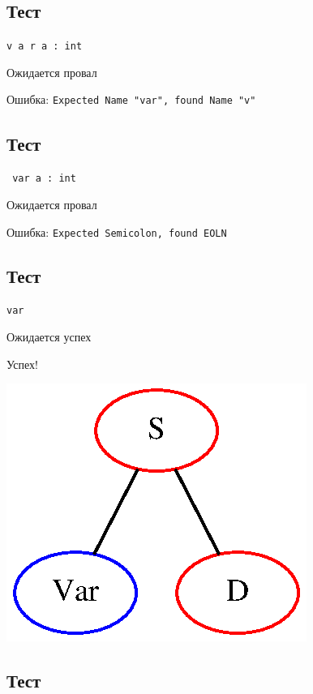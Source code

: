\subsection{Тест }

\texttt{v a r a : int}

Ожидается провал

Ошибка: \texttt{Expected Name "var", found Name "v"}

\subsection{Тест }

\texttt{     var a : int}

Ожидается провал

Ошибка: \texttt{Expected Semicolon, found EOLN}

\subsection{Тест }

\texttt{var}

Ожидается успех

Успех! 

\includegraphics[width=\textwidth]{test12.eps}

\subsection{Тест }

